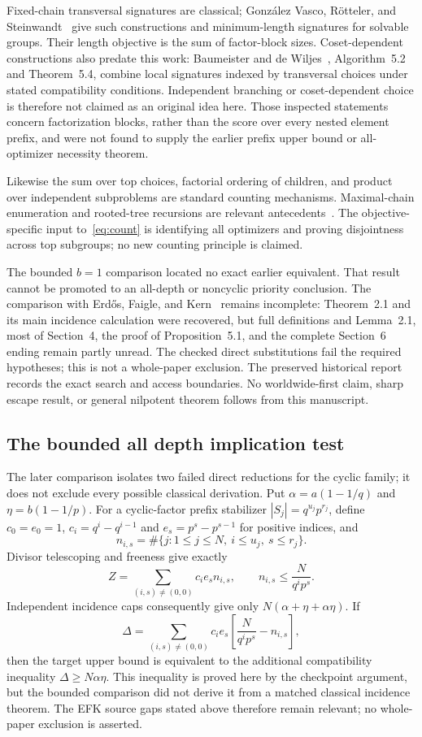\documentclass[11pt,letterpaper]{article}
\theoremstyle{definition}\newtheorem{definition}{Definition}
\begin{document}
Fixed-chain transversal signatures are classical; Gonz\'alez Vasco, R\"otteler, and Steinwandt~\cite{gvs} give such constructions and minimum-length signatures for solvable groups. Their length objective is the sum of factor-block sizes. Coset-dependent constructions also predate this work: Baumeister and de Wiljes~\cite{bdw}, Algorithm~5.2 and Theorem~5.4, combine local signatures indexed by transversal choices under stated compatibility conditions. Independent branching or coset-dependent choice is therefore not claimed as an original idea here. Those inspected statements concern factorization blocks, rather than the score over every nested element prefix, and were not found to supply the earlier prefix upper bound or all-optimizer necessity theorem.

Likewise the sum over top choices, factorial ordering of children, and product over independent subproblems are standard counting mechanisms. Maximal-chain enumeration and rooted-tree recursions are relevant antecedents~\cite{st,mbkk}. The objective-specific input to~\eqref{eq:count} is identifying all optimizers and proving disjointness across top subgroups; no new counting principle is claimed.

The bounded $b=1$ comparison located no exact earlier equivalent. That result cannot be promoted to an all-depth or noncyclic priority conclusion. The comparison with Erd\H{o}s, Faigle, and Kern~\cite{efk} remains incomplete: Theorem~2.1 and its main incidence calculation were recovered, but full definitions and Lemma~2.1, most of Section~4, the proof of Proposition~5.1, and the complete Section~6 ending remain partly unread. The checked direct substitutions fail the required hypotheses; this is not a whole-paper exclusion. The preserved historical report records the exact search and access boundaries. No worldwide-first claim, sharp escape result, or general nilpotent theorem follows from this manuscript.

\subsection{The bounded all depth implication test}
The later comparison isolates two failed direct reductions for the cyclic family; it does not exclude every possible classical derivation. Put $\alpha=a(1-1/q)$ and $\eta=b(1-1/p)$. For a cyclic-factor prefix stabilizer $|S_j|=q^{u_j}p^{r_j}$, define $c_0=e_0=1$, $c_i=q^i-q^{i-1}$ and $e_s=p^s-p^{s-1}$ for positive indices, and
\[
n_{i,s}=\#\{j:1\le j\le N,\ i\le u_j,\ s\le r_j\}.
\]
Divisor telescoping and freeness give exactly
\[
Z=\sum_{(i,s)\ne(0,0)}c_ie_s n_{i,s},\qquad
n_{i,s}\le\frac{N}{q^ip^s}.
\]
Independent incidence caps consequently give only $N(\alpha+\eta+\alpha\eta)$. If
\[
\Delta=\sum_{(i,s)\ne(0,0)}c_ie_s
\left[\frac{N}{q^ip^s}-n_{i,s}\right],
\]
then the target upper bound is equivalent to the additional compatibility inequality $\Delta\ge N\alpha\eta$. This inequality is proved here by the checkpoint argument, but the bounded comparison did not derive it from a matched classical incidence theorem. The EFK source gaps stated above therefore remain relevant; no whole-paper exclusion is asserted.
\end{document}
